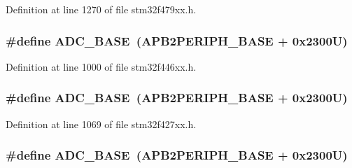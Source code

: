Definition at line 1270 of file stm32f479xx.\+h.

\subsubsection[{\texorpdfstring{A\+D\+C\+\_\+\+B\+A\+SE}{ADC_BASE}}]{\setlength{\rightskip}{0pt plus 5cm}\#define A\+D\+C\+\_\+\+B\+A\+SE~({\bf A\+P\+B2\+P\+E\+R\+I\+P\+H\+\_\+\+B\+A\+SE} + 0x2300\+U)}\hypertarget{group___peripheral__memory__map_gad06cb9e5985bd216a376f26f22303cd6}{}\label{group___peripheral__memory__map_gad06cb9e5985bd216a376f26f22303cd6}


Definition at line 1000 of file stm32f446xx.\+h.

\subsubsection[{\texorpdfstring{A\+D\+C\+\_\+\+B\+A\+SE}{ADC_BASE}}]{\setlength{\rightskip}{0pt plus 5cm}\#define A\+D\+C\+\_\+\+B\+A\+SE~({\bf A\+P\+B2\+P\+E\+R\+I\+P\+H\+\_\+\+B\+A\+SE} + 0x2300\+U)}\hypertarget{group___peripheral__memory__map_gad06cb9e5985bd216a376f26f22303cd6}{}\label{group___peripheral__memory__map_gad06cb9e5985bd216a376f26f22303cd6}


Definition at line 1069 of file stm32f427xx.\+h.

\subsubsection[{\texorpdfstring{A\+D\+C\+\_\+\+B\+A\+SE}{ADC_BASE}}]{\setlength{\rightskip}{0pt plus 5cm}\#define A\+D\+C\+\_\+\+B\+A\+SE~({\bf A\+P\+B2\+P\+E\+R\+I\+P\+H\+\_\+\+B\+A\+SE} + 0x2300\+U)}\hypertarget{group___peripheral__memory__map_gad06cb9e5985bd216a376f26f22303cd6}{}\label{group___peripheral__memory__map_gad06cb9e5985bd216a376f26f22303cd6}


